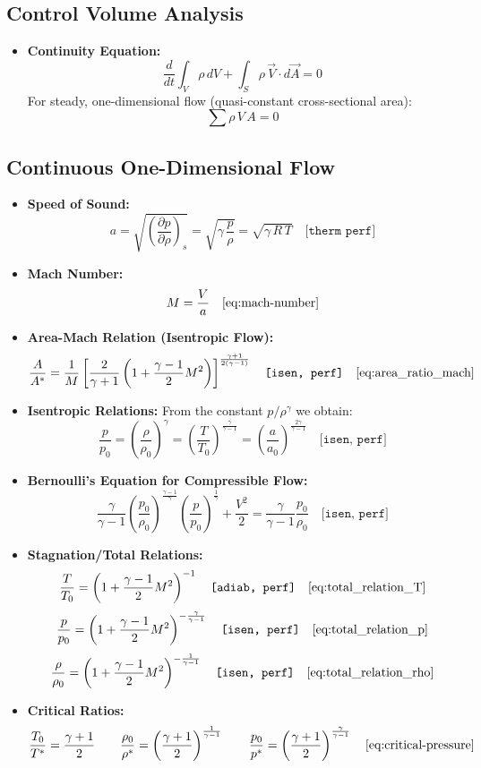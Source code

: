 \subsection*{Control Volume Analysis}
\begin{itemize}
    \item \textbf{Continuity Equation:}  
    $$
	    \frac{d}{dt} \int_V \rho\,dV + \int_S \rho\, \vec{V}\cdot d\vec{A} = 0
    $$
    For steady, one-dimensional flow (quasi-constant cross-sectional area):
    $$
		\sum \rho\,V\,A = 0
    $$
\end{itemize}

\subsection*{Continuous One-Dimensional Flow}
\begin{itemize}
    \item \textbf{Speed of Sound:}  
    $$
	    a = \sqrt{\left(\frac{\partial p}{\partial \rho}\right)_s} = \sqrt{\gamma\,\frac{p}{\rho}} = \sqrt{\gamma\,R\,T} \quad \texttt{[therm perf]}
    $$
    \item \textbf{Mach Number:}  
    $$
	    M = \frac{V}{a}\quad\eqref{eq:mach-number}
    $$
    \item \textbf{Area-Mach Relation (Isentropic Flow):}  
    $$
	    \frac{A}{A^*} = \frac{1}{M}\left[\frac{2}{\gamma+1}\left(1+\frac{\gamma-1}{2}M^2\right)\right]^{\frac{\gamma+1}{2(\gamma-1)}} \quad \texttt{[isen, perf]}\quad\eqref{eq:area_ratio_mach}
    $$
    \item \textbf{Isentropic Relations:}  
    From the constant $ p/\rho^\gamma $ we obtain:
    $$
	    \frac{p}{p_0} = \left(\frac{\rho}{\rho_0}\right)^\gamma = \left(\frac{T}{T_0}\right)^{\frac{\gamma}{\gamma-1}} = \left(\frac{a}{a_0}\right)^{\frac{2\gamma}{\gamma-1}} \quad \texttt{[isen, perf]}
    $$
    \item \textbf{Bernoulli’s Equation for Compressible Flow:}  
    $$
	    \frac{\gamma}{\gamma-1}\left(\frac{p_0}{\rho_0}\right)^{\frac{\gamma-1}{\gamma}}\left(\frac{p}{p_0}\right)^{\frac{1}{\gamma}} + \frac{V^2}{2} = \frac{\gamma}{\gamma-1}\frac{p_0}{\rho_0} \quad \texttt{[isen, perf]}
    $$
    \item \textbf{Stagnation/Total Relations:}  
    $$
	    \frac{T}{T_0} = \left(1+\frac{\gamma-1}{2}M^2\right)^{-1} \quad \texttt{[adiab, perf]} \quad \eqref{eq:total_relation_T}
    $$
    $$
	    \frac{p}{p_0} = \left(1+\frac{\gamma-1}{2}M^2\right)^{-\frac{\gamma}{\gamma-1}} \quad \texttt{[isen, perf]} \quad \eqref{eq:total_relation_p}
    $$
    $$
	    \frac{\rho}{\rho_0} = \left(1+\frac{\gamma-1}{2}M^2\right)^{-\frac{1}{\gamma-1}} \quad \texttt{[isen, perf]} \quad \eqref{eq:total_relation_rho}
    $$
    \item \textbf{Critical Ratios:}  
    $$
	    \frac{T_0}{T^*} = \frac{\gamma+1}{2}
			\qquad
	    \frac{\rho_0}{\rho^*} = \left(\frac{\gamma+1}{2}\right)^{\frac{1}{\gamma-1}}
			\qquad
	    \frac{p_0}{p^*} = \left(\frac{\gamma+1}{2}\right)^{\frac{\gamma}{\gamma-1}} \quad \eqref{eq:critical-pressure}
    $$
\end{itemize}

